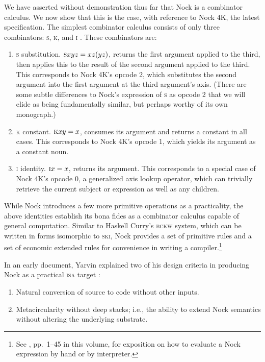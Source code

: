 \documentclass[twoside]{article}
\begin{document}
We have asserted without demonstration thus far that Nock is a combinator calculus.  We now show that this is the case, with reference to Nock 4K, the latest specification.  The simplest combinator calculus consists of only three combinators: \textsc{s}, \textsc{k}, and \textsc{i} \citep{Wolfram2021}.  These combinators are:

\begin{enumerate}
  \item  \textsc{s} substitution.  $\textsc{s}xyz = xz(yz)$, returns the first argument applied to the third, then applies this to the result of the second argument applied to the third.  This corresponds to Nock 4K's opcode 2, which substitutes the second argument into the first argument at the third argument's axis.  (There are some subtle differences to Nock's expression of \textsc{s} as opcode 2 that we will elide as being fundamentally similar, but perhaps worthy of its own monograph.)
  \item  \textsc{k} constant.  $\textsc{k}xy = x$, consumes its argument and returns a constant in all cases.  This corresponds to Nock 4K's opcode 1, which yields its argument as a constant noun.
  \item  \textsc{i} identity.  $\textsc{i}x = x$, returns its argument.  This corresponds to a special case of Nock 4K's opcode 0, a generalized axis lookup operator, which can trivially retrieve the current subject or expression as well as any children.
\end{enumerate}

\noindent
While Nock introduces a few more primitive operations as a practicality, the above identities establish its bona fides as a combinator calculus capable of general computation.  Similar to Haskell Curry's \textsc{bckw} system, which can be written in forms isomorphic to \textsc{ski}, Nock provides a set of primitive rules and a set of economic extended rules for convenience in writing a compiler.\footnote{See , pp.~1–45 in this volume, for exposition on how to evaluate a Nock expression by hand or by interpreter.}

In an early document, Yarvin explained two of his design criteria in producing Nock as a practical \textsc{isa} target \citep{Yarvin2010}:

\begin{enumerate}
  \item  Natural conversion of source to code without other inputs.
  \item  Metacircularity without deep stacks; i.e., the ability to extend Nock semantics without altering the underlying substrate.
\end{enumerate}
\end{document}

